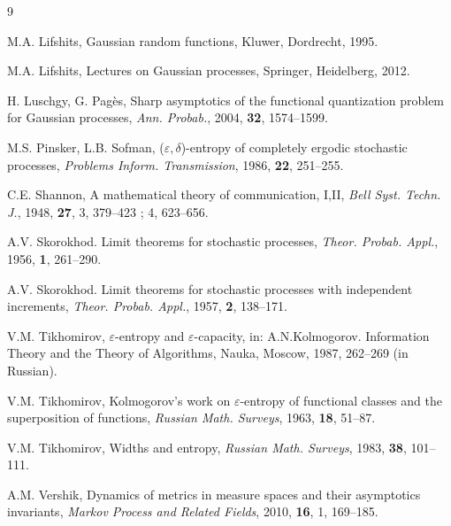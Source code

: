 \documentclass[12pt]{article}
\let\ep\varepsilon
\theoremstyle{definition}
\begin{document}
\begin{thebibliography}{9}
{%


M.A. Lifshits, Gaussian random functions, Kluwer, Dordrecht, 1995.

M.A. Lifshits, Lectures on Gaussian processes, Springer, Heidelberg, 2012.

H. Luschgy, G. Pag\`es,  Sharp asymptotics of the functional quantization problem for Gaussian processes,
\emph{Ann. Probab.}, 2004, {\bf 32}, 1574--1599.

M.S. Pinsker, L.B. Sofman, ($\ep,\delta$)-entropy of completely ergodic stochastic processes, 
\emph{Problems Inform. Transmission}, 1986, {\bf 22}, 251--255.


C.E. Shannon, A mathematical theory of communication, I,II, \emph{Bell Syst. Techn. J.}, 
1948, \textbf{27}, 3, 379--423 ; 4, 623--656.

A.V. Skorokhod. Limit theorems for stochastic processes, \emph{Theor. Probab. Appl.},
1956, {\bf 1}, 261--290.

A.V. Skorokhod. Limit theorems for stochastic processes with independent increments, 
\emph{Theor. Probab. Appl.}, 1957, {\bf 2}, 138--171.

V.M. Tikhomirov, $\ep$-entropy and $\ep$-capacity, in: A.N.Kolmogorov. Information Theory and the Theory of Algorithms, Nauka, Moscow, 1987, 262--269 (in Russian).

V.M. Tikhomirov, Kolmogorov’s work on $\ep$-entropy of functional classes and the superposition of functions, \emph{Russian Math. Surveys}, 1963, {\bf 18}, 51--87.

V.M. Tikhomirov, Widths and entropy, \emph{Russian Math. Surveys}, 1983, {\bf 38},  101--111.

A.M. Vershik, Dynamics of metrics in measure spaces and their asymptotics invariants,
\emph{Markov Process and Related Fields}, 2010, {\bf 16}, 1, 169--185.

}
\end{thebibliography}
\end{document}
